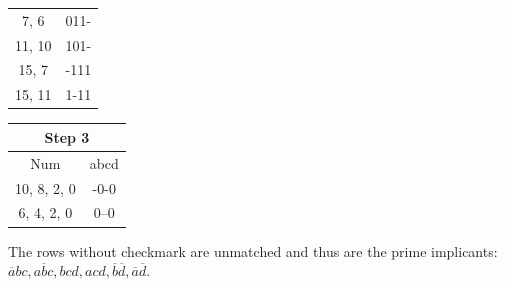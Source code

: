 \documentclass[pdftex,12pt,a4paper]{article}
\begin{document}
\begin{enumerate}[label=\alph*)]
\begin{minipage}[t]{.3\textwidth}
\begin{tabular}{|c|c|}
\hline
7, 6 & 011- \\
11, 10 & 101- \\

\hline

15, 7 & -111 \\
15, 11 & 1-11 \\
\hline
\end{tabular}
\end{minipage}%
\begin{minipage}[t]{.3\textwidth} %
\begin{tabular}{|c|c|}
\hline
\multicolumn{2}{|c|}{Step 3} \\
\hline
Num & abcd \\
\hline
10, 8, 2, 0 & -0-0 \\
6, 4, 2, 0 &  0--0 \\
\hline

\end{tabular}
\end{minipage}

The rows without checkmark are unmatched and thus are the prime implicants: $\overline{a}bc, a\overline{b}c, bcd, acd, \overline{b}\overline{d}, \overline{a}\overline{d}.$ \\
  
\end{enumerate}
\end{document}
